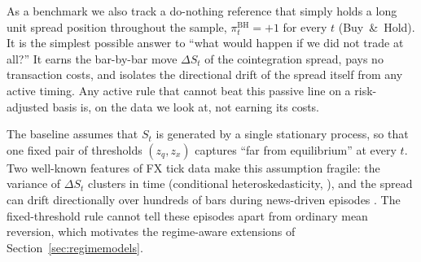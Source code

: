 As a benchmark we also track a do-nothing reference that simply holds a long unit spread position throughout the sample, $\pi_t^{\mathrm{BH}} = +1$ for every $t$ (Buy~\&~Hold). It is the simplest possible answer to ``what would happen if we did not trade at all?'' It earns the bar-by-bar move $\Delta S_t$ of the cointegration spread, pays no transaction costs, and isolates the directional drift of the spread itself from any active timing. Any active rule that cannot beat this passive line on a risk-adjusted basis is, on the data we look at, not earning its costs.

The baseline assumes that $S_t$ is generated by a single stationary process, so that one fixed pair of thresholds $(z_q, z_x)$ captures ``far from equilibrium'' at every $t$. Two well-known features of FX tick data make this assumption fragile: the variance of $\Delta S_t$ clusters in time (conditional heteroskedasticity, \parencite{cont2001empirical}), and the spread can drift directionally over hundreds of bars during news-driven episodes \parencite{hasbrouck2007microstructure}. The fixed-threshold rule cannot tell these episodes apart from ordinary mean reversion, which motivates the regime-aware extensions of Section~\ref{sec:regimemodels}.
